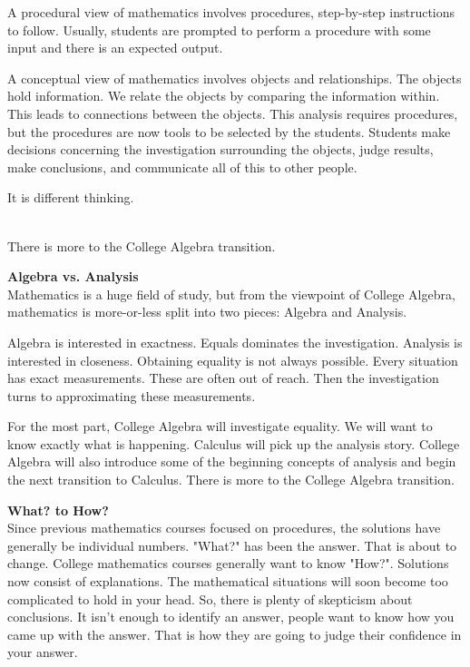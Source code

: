 \documentclass{ximera}
\begin{document}
\begin{idea}
A procedural view of mathematics involves procedures, step-by-step instructions to follow. Usually, students are prompted to perform a procedure with some input and there is an expected output.  

A conceptual view of mathematics involves objects and relationships. The objects hold information. We relate the objects by comparing the information within. This leads to connections between the objects. This analysis requires procedures, but the procedures are now tools to be selected by the students.  Students make decisions concerning the investigation surrounding the objects, judge results, make conclusions, and communicate all of this to other people.

It is different thinking.

\end{idea}




\quad \\
There is more to the College Algebra transition.







\textbf{Algebra vs. Analysis} \\
Mathematics is a huge field of study, but from the viewpoint of College Algebra, mathematics is more-or-less split into two pieces: Algebra and Analysis.

Algebra is interested in exactness.  Equals dominates the investigation. Analysis is interested in closeness.  Obtaining equality is not always possible.  Every situation has exact measurements. These are often out of reach.  Then the investigation turns to approximating these measurements.

For the most part, College Algebra will investigate equality.  We will want to know exactly what is happening. Calculus will pick up the analysis story. College Algebra will also introduce some of the beginning concepts of analysis and begin the next transition to Calculus.
There is more to the College Algebra transition.






\textbf{What? to How?} \\ 
Since previous mathematics courses focused on procedures, the solutions have generally be individual numbers.  "What?" has been the answer.  That is about to change. College mathematics courses generally want to know "How?". Solutions now consist of explanations. 
The mathematical situations will soon become too complicated to hold in your head.  So, there is plenty of skepticism about conclusions. It isn't enough to identify an answer, people want to know how you came up with the answer.  That is how they are going to judge their confidence in your answer.  
\end{document}
